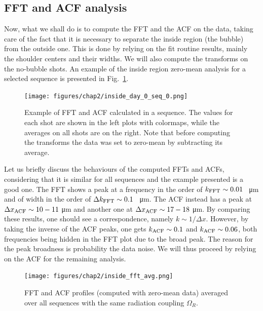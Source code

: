 \subsection{FFT and ACF analysis}
Now, what we shall do is to compute the FFT and the ACF on the data, taking care of the fact that it is necessary to separate the inside region (the bubble) from the outside one. This is done by relying on the fit routine results, mainly the shoulder centers and their widths.
We will also compute the transforms on the no-bubble shots. An example of the inside region zero-mean analysis for a selected sequence is presented in Fig.\ \ref{fig:inside_00}.
\begin{figure}[h!]
    \centering
    \texttt{[image: figures/chap2/inside\_day\_0\_seq\_0.png]}
    \caption{Example of FFT and ACF calculated in a sequence. The values for each shot are shown in the left plots with colormaps, while the averages on all shots are on the right. Note that before computing the transforms the data was set to zero-mean by subtracting its average.}
    \label{fig:inside_00}
\end{figure}

Let us briefly discuss the behaviours of the computed FFTs and ACFs, considering that it is similar for all sequences and the example presented is a good one. The FFT shows a peak at a frequency in the order of $k_{\rm FFT} \sim 0.01$ \unit{\per\micro\meter} and of width in the order of $\Delta k_{\rm FFT} \sim 0.1$ \unit{\per\micro\meter}. The ACF instead has a peak at $\Delta x_{\rm ACF} \sim 10-11$ \unit{\micro\meter} and another one at $\Delta x_{\rm ACF} \sim 17-18$ \unit{\micro\meter}. By comparing these results, one should see a correspondence, namely $k \sim 1/\Delta x$. However, by taking the inverse of the ACF peaks, one gets $k_{\rm ACF} \sim 0.1$ and $k_{\rm ACF} \sim 0.06$, both frequencies being hidden in the FFT plot due to the broad peak. The reason for the peak broadness is probability the data noise. We will thus proceed by relying on the ACF for the remaining analysis.

\begin{figure}[t!]
    \centering
    \texttt{[image: figures/chap2/inside\_fft\_avg.png]}
    \caption{FFT and ACF profiles (computed with zero-mean data) averaged over all sequences with the same radiation coupling $\Omega_R$.}
    \label{fig:inside_avg}
\end{figure}

